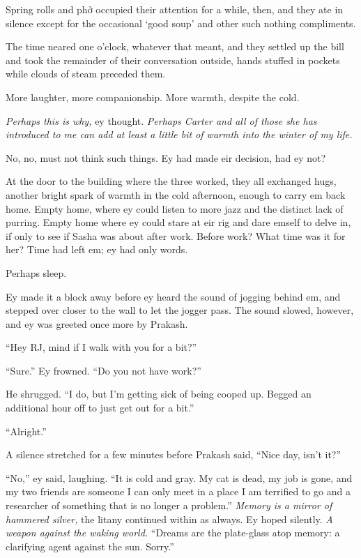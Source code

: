 Spring rolls and phở occupied their attention for a while, then, and they ate in silence except for the occasional `good soup' and other such nothing compliments.

The time neared one o'clock, whatever that meant, and they settled up the bill and took the remainder of their conversation outside, hands stuffed in pockets while clouds of steam preceded them.

More laughter, more companionship. More warmth, despite the cold.

\emph{Perhaps this is why,} ey thought. \emph{Perhaps Carter and all of those she has introduced to me can add at least a little bit of warmth into the winter of my life.}

No, no, must not think such things. Ey had made eir decision, had ey not?

At the door to the building where the three worked, they all exchanged hugs, another bright spark of warmth in the cold afternoon, enough to carry em back home. Empty home, where ey could listen to more jazz and the distinct lack of purring. Empty home where ey could stare at eir rig and dare emself to delve in, if only to see if Sasha was about after work. Before work? What time was it for her? Time had left em; ey had only words.

Perhaps sleep.

Ey made it a block away before ey heard the sound of jogging behind em, and stepped over closer to the wall to let the jogger pass. The sound slowed, however, and ey was greeted once more by Prakash.

``Hey RJ, mind if I walk with you for a bit?''

``Sure.'' Ey frowned. ``Do you not have work?''

He shrugged. ``I do, but I'm getting sick of being cooped up. Begged an additional hour off to just get out for a bit.''

``Alright.''

A silence stretched for a few minutes before Prakash said, ``Nice day, isn't it?''

``No,'' ey said, laughing. ``It is cold and gray. My cat is dead, my job is gone, and my two friends are someone I can only meet in a place I am terrified to go and a researcher of something that is no longer a problem.'' \emph{Memory is a mirror of hammered silver,} the litany continued within as always. Ey hoped silently. \emph{A weapon against the waking world.} ``Dreams are the plate-glass atop memory: a clarifying agent against the sun. Sorry.''


